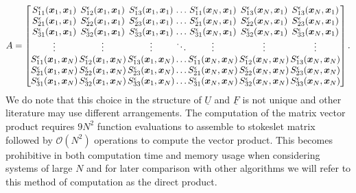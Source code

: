 \begin{equation}
\begingroup
\setlength\arraycolsep{0.8pt}
A = \begin{bmatrix}
S^{\epsilon}_{11}(\bm{x}_1,{\bm{x}}_1) & S^{\epsilon}_{12}(\bm{x}_1,{\bm{x}}_1) & S^{\epsilon}_{13}(\bm{x}_1,{\bm{x}}_1) & \dots & S^{\epsilon}_{11}(\bm{x}_N,{\bm{x}}_1) & S^{\epsilon}_{13}(\bm{x}_N,{\bm{x}}_1) & S^{\epsilon}_{13}(\bm{x}_N,{\bm{x}}_1)\\
S^{\epsilon}_{21}(\bm{x}_1,{\bm{x}}_1) & S^{\epsilon}_{22}(\bm{x}_1,{\bm{x}}_1) & S^{\epsilon}_{23}(\bm{x}_1,{\bm{x}}_1) & \dots & S^{\epsilon}_{21}(\bm{x}_N,{\bm{x}}_1) & S^{\epsilon}_{22}(\bm{x}_N,{\bm{x}}_1) & S^{\epsilon}_{23}(\bm{x}_N,{\bm{x}}_1)\\
S^{\epsilon}_{31}(\bm{x}_1,{\bm{x}}_1) & S^{\epsilon}_{32}(\bm{x}_1,{\bm{x}}_1) & S^{\epsilon}_{33}(\bm{x}_1,{\bm{x}}_1) & \dots & S^{\epsilon}_{31}(\bm{x}_N,{\bm{x}}_1) & S^{\epsilon}_{32}(\bm{x}_N,{\bm{x}}_1) & S^{\epsilon}_{33}(\bm{x}_N,{\bm{x}}_1)\\
\vdots & \vdots & \vdots & \ddots & \vdots & \vdots & \vdots \\
S^{\epsilon}_{11}(\bm{x}_1,{\bm{x}}_N) & S^{\epsilon}_{12}(\bm{x}_1,{\bm{x}}_N) & S^{\epsilon}_{13}(\bm{x}_1,{\bm{x}}_N) & \dots & S^{\epsilon}_{11}(\bm{x}_N,{\bm{x}}_N) & S^{\epsilon}_{12}(\bm{x}_N,{\bm{x}}_N) & S^{\epsilon}_{13}(\bm{x}_N,{\bm{x}}_N)  \\
S^{\epsilon}_{21}(\bm{x}_1,{\bm{x}}_N) & S^{\epsilon}_{22}(\bm{x}_1,{\bm{x}}_N) & S^{\epsilon}_{23}(\bm{x}_1,{\bm{x}}_N) & \dots & S^{\epsilon}_{21}(\bm{x}_N,{\bm{x}}_N) & S^{\epsilon}_{22}(\bm{x}_N,{\bm{x}}_N) & S^{\epsilon}_{23}(\bm{x}_N,{\bm{x}}_N) \\
S^{\epsilon}_{31}(\bm{x}_1,{\bm{x}}_N) & S^{\epsilon}_{32}(\bm{x}_1,{\bm{x}}_N) & S^{\epsilon}_{33}(\bm{x}_1,{\bm{x}}_N) & \dots & S^{\epsilon}_{31}(\bm{x}_N,{\bm{x}}_N) & S^{\epsilon}_{32}(\bm{x}_N,{\bm{x}}_N) & S^{\epsilon}_{33}(\bm{x}_N,{\bm{x}}_N) \\
\end{bmatrix}.
\endgroup
\label{eq:StokeletMatrix}
\end{equation}
\normalsize
We do note that this choice in the structure of $\underline{U}$ and $\underline{F}$ is not unique and other literature may use different arrangements. The computation of the matrix vector product requires $9N^2$ function evaluations to assemble to stokeslet matrix followed by $\mathcal{O}(N^2)$ operations to compute the vector product. This becomes prohibitive in both computation time and memory usage when considering systems of large $N$ and for later comparison with other algorithms we will refer to this method of computation as the direct product.

